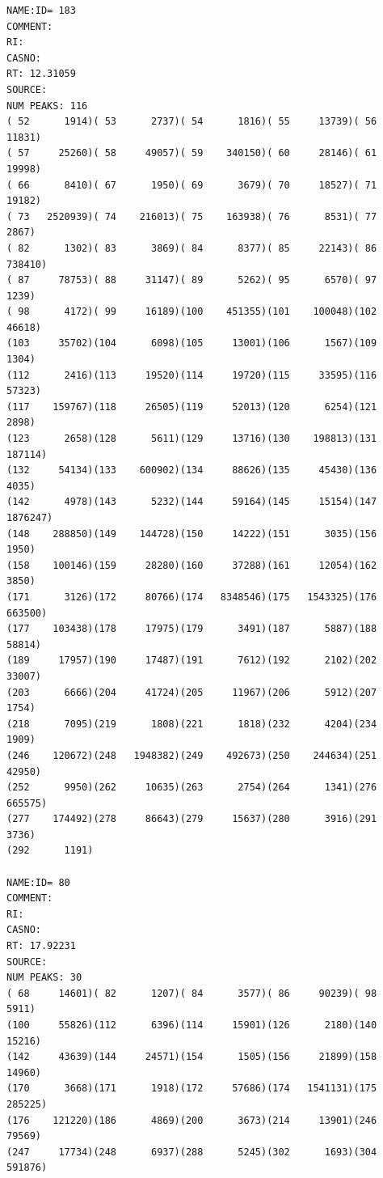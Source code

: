 \documentclass[11pt,a4paper]{article}
\begin{document}
\begin{verbatim}
NAME:ID= 183 
COMMENT:
RI:
CASNO:
RT: 12.31059 
SOURCE:
NUM PEAKS: 116 
( 52      1914)( 53      2737)( 54      1816)( 55     13739)( 56     11831)
( 57     25260)( 58     49057)( 59    340150)( 60     28146)( 61     19998)
( 66      8410)( 67      1950)( 69      3679)( 70     18527)( 71     19182)
( 73   2520939)( 74    216013)( 75    163938)( 76      8531)( 77      2867)
( 82      1302)( 83      3869)( 84      8377)( 85     22143)( 86    738410)
( 87     78753)( 88     31147)( 89      5262)( 95      6570)( 97      1239)
( 98      4172)( 99     16189)(100    451355)(101    100048)(102     46618)
(103     35702)(104      6098)(105     13001)(106      1567)(109      1304)
(112      2416)(113     19520)(114     19720)(115     33595)(116     57323)
(117    159767)(118     26505)(119     52013)(120      6254)(121      2898)
(123      2658)(128      5611)(129     13716)(130    198813)(131    187114)
(132     54134)(133    600902)(134     88626)(135     45430)(136      4035)
(142      4978)(143      5232)(144     59164)(145     15154)(147   1876247)
(148    288850)(149    144728)(150     14222)(151      3035)(156      1950)
(158    100146)(159     28280)(160     37288)(161     12054)(162      3850)
(171      3126)(172     80766)(174   8348546)(175   1543325)(176    663500)
(177    103438)(178     17975)(179      3491)(187      5887)(188     58814)
(189     17957)(190     17487)(191      7612)(192      2102)(202     33007)
(203      6666)(204     41724)(205     11967)(206      5912)(207      1754)
(218      7095)(219      1808)(221      1818)(232      4204)(234      1909)
(246    120672)(248   1948382)(249    492673)(250    244634)(251     42950)
(252      9950)(262     10635)(263      2754)(264      1341)(276    665575)
(277    174492)(278     86643)(279     15637)(280      3916)(291      3736)
(292      1191)

NAME:ID= 80 
COMMENT:
RI:
CASNO:
RT: 17.92231 
SOURCE:
NUM PEAKS: 30 
( 68     14601)( 82      1207)( 84      3577)( 86     90239)( 98      5911)
(100     55826)(112      6396)(114     15901)(126      2180)(140     15216)
(142     43639)(144     24571)(154      1505)(156     21899)(158     14960)
(170      3668)(171      1918)(172     57686)(174   1541131)(175    285225)
(176    121220)(186      4869)(200      3673)(214     13901)(246     79569)
(247     17734)(248      6937)(288      5245)(302      1693)(304    591876)

\end{verbatim}

\newpage
\end{document}
